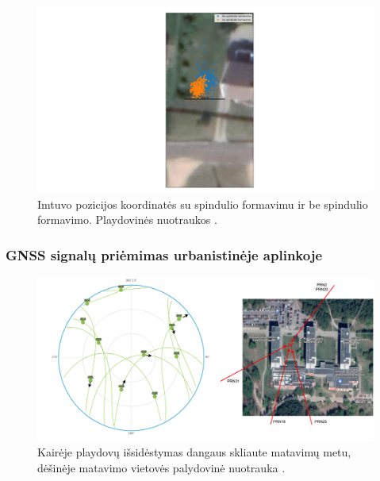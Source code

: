 \documentclass[main.tex]{subfiles}
\begin{document}
\begin{figure}[ht]
    \begin{centering}
    \hspace*{-4cm}\includegraphics[scale=0.5]{drawings/one_reflection_map}
    \par\end{centering}
    \protect\caption{\label{fig:single_reflection_map}Imtuvo pozicijos koordinatės su spindulio formavimu ir be spindulio formavimo. Playdovinės nuotraukos \cite{google_maps}.}
\end{figure}

\subsubsection{GNSS signalų priėmimas urbanistinėje aplinkoje}


\begin{figure}[ht]
    \begin{centering}
    \includegraphics[scale=0.4]{drawings/vu_sats_map.drawio}
    \par\end{centering}
    \protect\caption{\label{fig:two_reflection_sat_pos}Kairėje playdovų išsidėstymas dangaus skliaute matavimų metu, dėšinėje matavimo vietovės palydovinė nuotrauka \cite{google_maps}.}
\end{figure}
\end{document}
